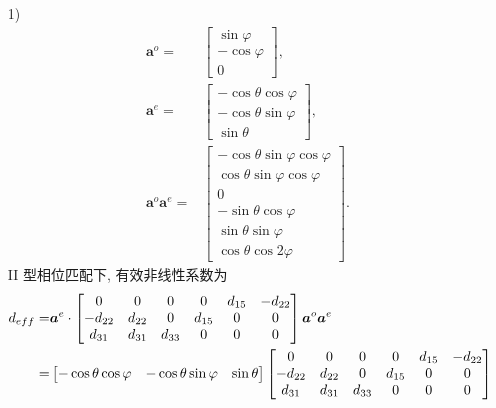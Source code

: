 \documentclass{assignment}
\begin{document}
\begin{sol}
    \begin{itemize}
        \item[1)] 
        \begin{align}
            \bm{a}^o=&\begin{bmatrix}
                \sin\varphi\\
                -\cos\varphi\\
                0
            \end{bmatrix},\\
            \bm{a}^e=&\begin{bmatrix}
                -\cos\theta\cos\varphi\\
                -\cos\theta\sin\varphi\\
                \sin\theta
            \end{bmatrix},\\
            \bm{a}^o\bm{a}^e=&\begin{bmatrix}
                -\cos\theta\sin\varphi\cos\varphi\\
                \cos\theta\sin\varphi\cos\varphi\\
                0\\
                -\sin\theta\cos\varphi\\
                \sin\theta\sin\varphi\\
                \cos\theta\cos 2\varphi
            \end{bmatrix}.
        \end{align}
        II 型相位匹配下, 有效非线性系数为
        \begin{align}
            \notag d_{eff}=&\bm{a}^e\cdot\begin{bmatrix}
                0&0&0&0&d_{15}&-d_{22}\\
                -d_{22}&d_{22}&0&d_{15}&0&0\\
                d_{31}&d_{31}&d_{33}&0&0&0
            \end{bmatrix}\bm{a}^o\bm{a}^e\\
            \notag=&\begin{bmatrix}
                -\cos\theta\cos\varphi&-\cos\theta\sin\varphi&\sin\theta
            \end{bmatrix}\begin{bmatrix}
                0&0&0&0&d_{15}&-d_{22}\\
                -d_{22}&d_{22}&0&d_{15}&0&0\\
                d_{31}&d_{31}&d_{33}&0&0&0

\end{bmatrix}
\end{align}
\end{itemize}
\end{sol}
\end{document}
